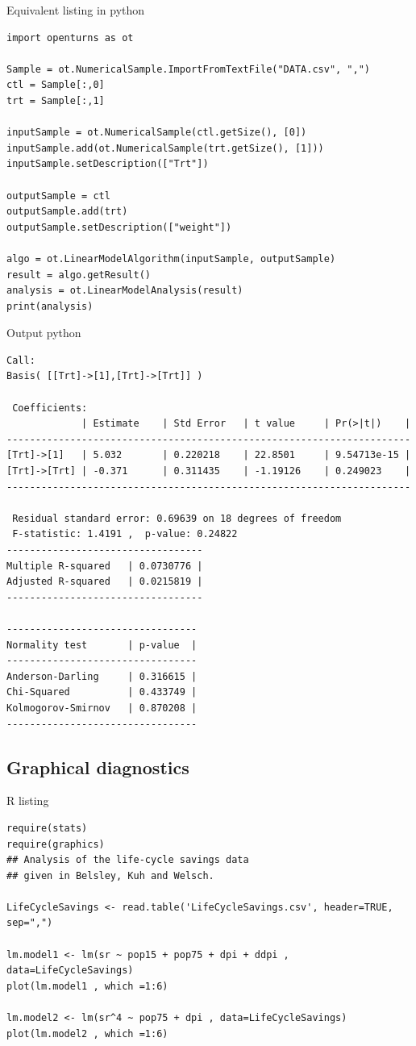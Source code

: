 \newpage
Equivalent listing in python
\begin{lstlisting}[style=pythonStyle]
import openturns as ot

Sample = ot.NumericalSample.ImportFromTextFile("DATA.csv", ",")
ctl = Sample[:,0]
trt = Sample[:,1]

inputSample = ot.NumericalSample(ctl.getSize(), [0])
inputSample.add(ot.NumericalSample(trt.getSize(), [1]))
inputSample.setDescription(["Trt"])

outputSample = ctl
outputSample.add(trt)
outputSample.setDescription(["weight"])

algo = ot.LinearModelAlgorithm(inputSample, outputSample)
result = algo.getResult()
analysis = ot.LinearModelAnalysis(result)
print(analysis)
\end{lstlisting}

Output python
\begin{lstlisting}[style=output]
 Call:
Basis( [[Trt]->[1],[Trt]->[Trt]] )

 Coefficients:
             | Estimate    | Std Error   | t value     | Pr(>|t|)    | 
----------------------------------------------------------------------
[Trt]->[1]   | 5.032       | 0.220218    | 22.8501     | 9.54713e-15 | 
[Trt]->[Trt] | -0.371      | 0.311435    | -1.19126    | 0.249023    | 
----------------------------------------------------------------------

 Residual standard error: 0.69639 on 18 degrees of freedom 
 F-statistic: 1.4191 ,  p-value: 0.24822
----------------------------------
Multiple R-squared   | 0.0730776 | 
Adjusted R-squared   | 0.0215819 | 
----------------------------------

---------------------------------
Normality test       | p-value  | 
---------------------------------
Anderson-Darling     | 0.316615 | 
Chi-Squared          | 0.433749 | 
Kolmogorov-Smirnov   | 0.870208 | 
---------------------------------
\end{lstlisting}

\newpage
\subsection{Graphical diagnostics}

R listing
\begin{lstlisting}[style=RStyle,basicstyle=\footnotesize]
require(stats)
require(graphics)
## Analysis of the life-cycle savings data
## given in Belsley, Kuh and Welsch.

LifeCycleSavings <- read.table('LifeCycleSavings.csv', header=TRUE, sep=",")

lm.model1 <- lm(sr ~ pop15 + pop75 + dpi + ddpi , data=LifeCycleSavings)
plot(lm.model1 , which =1:6)

lm.model2 <- lm(sr^4 ~ pop75 + dpi , data=LifeCycleSavings)
plot(lm.model2 , which =1:6)
\end{lstlisting}

